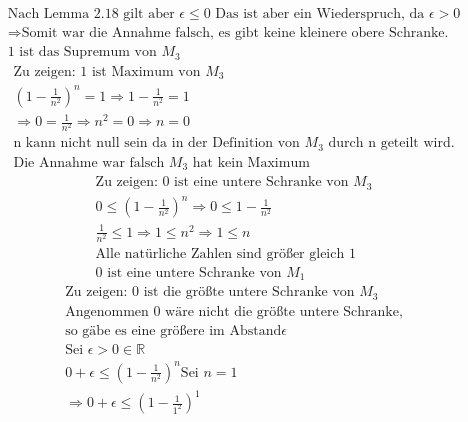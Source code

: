 \documentclass{article}
\begin{document}
\begin{enumerate}[label = (\alph*)]
\begin{gather*}
                    \text{Nach Lemma 2.18 gilt aber } \epsilon \leq 0 \text{ Das ist aber ein Wiederspruch, da } \epsilon > 0 \\
                    \Rightarrow \text{Somit war die Annahme falsch, es gibt keine kleinere obere Schranke.} \\
                    \text{1 ist das Supremum von } M_3
                \end{gather*}
                \begin{gather*}
                    \text{Zu zeigen: 1 ist Maximum von } M_3 \\
                    {\left(1- \frac{1}{n^2}\right)}^n = 1 \Rightarrow 1- \frac{1}{n^2} = 1 \\
                    \Rightarrow 0 = \frac{1}{n^2} \Rightarrow n^2 = 0 \Rightarrow n=0 \\
                    \text{n kann nicht null sein da in der Definition von } M_3 \text{ durch n geteilt wird.} \\
                    \text{Die Annahme war falsch } M_3 \text{ hat kein Maximum}
                \end{gather*}
                \begin{gather*}
                    \text{Zu zeigen: 0 ist eine untere Schranke von } M_3 \\
                    0 \leq {\left(1- \frac{1}{n^2}\right)}^n \Rightarrow 0 \leq 1- \frac{1}{n^2} \\
                    \frac{1}{n^2} \leq 1 \Rightarrow 1 \leq n^2 \Rightarrow 1 \leq n \\
                    \text{Alle natürliche Zahlen sind größer gleich 1} \\
                    \text{0 ist eine untere Schranke von } M_1
                \end{gather*}
                \begin{gather*}
                    \text{Zu zeigen: 0 ist die größte untere Schranke von } M_3 \\
                    \text{Angenommen 0 wäre nicht die größte untere Schranke,} \\
                    \text{so gäbe es eine größere im Abstand} \epsilon \\
                    \text{Sei } \epsilon > 0 \in \mathbb{R} \\
                    0 + \epsilon \leq {\left(1- \frac{1}{n^2}\right)}^n
                    \text{Sei } n=1 \\
                    \Rightarrow 0 + \epsilon \leq {\left(1- \frac{1}{1^2}\right)}^1 \\

\end{gather*}
\end{enumerate}
\end{document}
